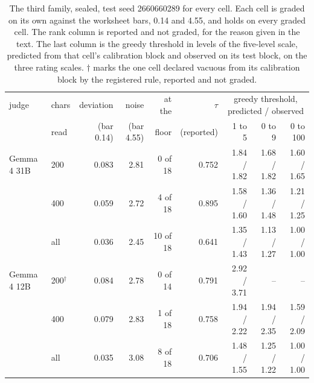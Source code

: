 
\begin{table}[h]
\centering
\footnotesize
\setlength{\tabcolsep}{3.5pt}
\caption{The third family, sealed, test seed 2660660289 for every cell. Each cell is graded on its own against the worksheet bars, 0.14 and 4.55, and holds on every graded cell. The rank column is reported and not graded, for the reason given in the text. The last column is the greedy threshold in levels of the five-level scale, predicted from that cell's calibration block and observed on its test block, on the three rating scales. $\dagger$ marks the one cell declared vacuous from its calibration block by the registered rule, reported and not graded.}
\label{tab:reviews}
\begin{tabular}{llrrrrrrr}
\toprule
judge & chars & deviation & noise & at the & $\tau$ & \multicolumn{3}{c}{greedy threshold, predicted / observed} \\
 & read & (bar 0.14) & (bar 4.55) & floor & (reported) & 1 to 5 & 0 to 9 & 0 to 100 \\
\midrule
Gemma 4 31B & 200 & 0.083 & 2.81 & 0 of 18 & 0.752 & 1.84 / 1.82 & 1.68 / 1.82 & 1.60 / 1.65 \\
 & 400 & 0.059 & 2.72 & 4 of 18 & 0.895 & 1.58 / 1.60 & 1.36 / 1.48 & 1.21 / 1.25 \\
 & all & 0.036 & 2.45 & 10 of 18 & 0.641 & 1.35 / 1.43 & 1.13 / 1.27 & 1.00 / 1.00 \\
Gemma 4 12B & 200$^{\dagger}$ & 0.084 & 2.78 & 0 of 14 & 0.791 & 2.92 / 3.71 & -- & -- \\
 & 400 & 0.079 & 2.83 & 1 of 18 & 0.758 & 1.94 / 2.22 & 1.94 / 2.35 & 1.59 / 2.09 \\
 & all & 0.035 & 3.08 & 8 of 18 & 0.706 & 1.48 / 1.55 & 1.25 / 1.22 & 1.00 / 1.00 \\
\bottomrule
\end{tabular}
\end{table}

